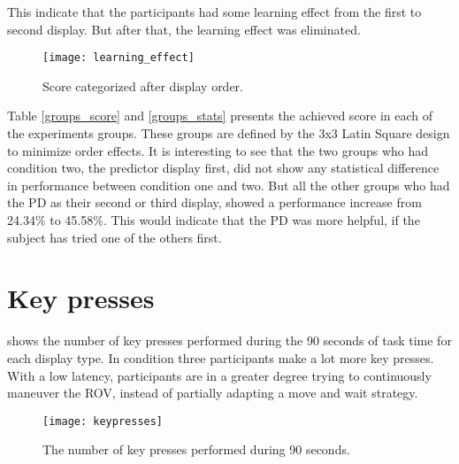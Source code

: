 This indicate that the participants had some learning effect from the first to second display. But after that, the learning effect was eliminated.

\begin{figure}[h!]
    \centering
    \texttt{[image: learning\_effect]}
    \caption{Score categorized after display order.}
    \label{learning_effect}
\end{figure}

\clearpage
Table \ref{groups_score} and \ref{groups_stats} presents the achieved score in each of the experiments groups. These groups are defined by the 3x3 Latin Square design to minimize order effects. It is interesting to see that the two groups who had condition two, the predictor display first, did not show any statistical difference in performance between condition one and two. But all the other groups who had the PD as their second or third display, showed a performance increase from 24.34\% to 45.58\%. This would indicate that the PD was more helpful, if the subject has tried one of the others first.




\clearpage
\section{Key presses}

 shows the number of key presses performed during the 90 seconds of task time for each display type. In condition three participants make a lot more key presses. With a low latency, participants are in a greater degree trying to continuously maneuver the ROV, instead of partially adapting a move and wait strategy.

\begin{figure}[h!]
    \centering
    \texttt{[image: keypresses]}
    \caption{The number of key presses performed during 90 seconds.}
    \label{keypresses}
\end{figure}
